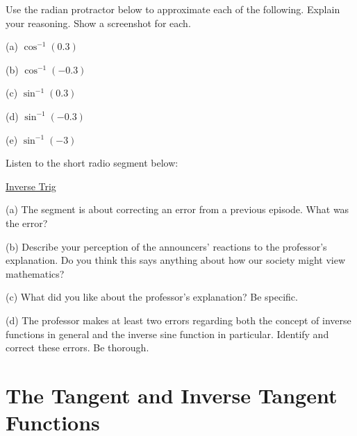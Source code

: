 \documentclass{ximera}
\begin{document}
\begin{question} \label{Ex1dsfsdafgt4hh:Inverse}
Use the radian protractor below to approximate each of the following. Explain your reasoning. Show a screenshot for each.

(a) $\cos^{-1}(0.3)$

(b) $\cos^{-1}(-0.3)$

(c) $\sin^{-1}(0.3)$

(d) $\sin^{-1}(-0.3)$

(e) $\sin^{-1}(-3)$


\begin{exploration}\label{Exp3:Comp}

 
\begin{onlineOnly}
    \begin{center}
\end{center}
\end{onlineOnly}
\end{exploration}

\end{question}



\begin{question} \label{Q8:Inverses}

Listen to the short radio segment below:

\href{https://www.npr.org/2023/04/02/1167645463/sunday-puzzle-correction-a-
lesson-in-trigonometry}{Inverse Trig}


(a) The segment is about correcting an error from a previous episode. What was the error?


(b) Describe your perception of the announcers’ reactions to the professor’s explanation. Do you think this says anything about how our society might view mathematics?

(c) What did you like about the professor’s explanation? Be specific.

(d) The professor makes at least two errors regarding both the concept of inverse functions in general and the inverse sine function in particular. Identify and correct these errors. Be thorough.

\end{question}

\section{The Tangent and Inverse Tangent Functions}
\end{document}
